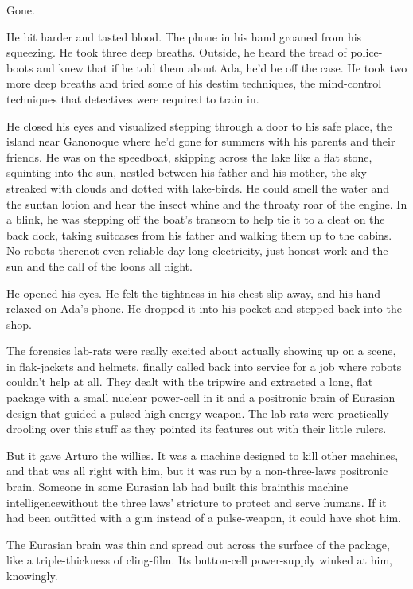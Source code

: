 Gone.

He bit harder and tasted blood. The phone in his hand groaned from
his squeezing. He took three deep breaths. Outside, he heard the
tread of police-boots and knew that if he told them about Ada, he’d
be off the case. He took two more deep breaths and tried some of
his destim techniques, the mind-control techniques that detectives
were required to train in.

He closed his eyes and visualized stepping through a door to his
safe place, the island near Ganonoque where he’d gone for summers
with his parents and their friends. He was on the speedboat,
skipping across the lake like a flat stone, squinting into the sun,
nestled between his father and his mother, the sky streaked with
clouds and dotted with lake-birds. He could smell the water and the
suntan lotion and hear the insect whine and the throaty roar of the
engine. In a blink, he was stepping off the boat’s transom to help
tie it to a cleat on the back dock, taking suitcases from his
father and walking them up to the cabins. No robots there{\dash}not even
reliable day-long electricity, just honest work and the sun and the
call of the loons all night.

He opened his eyes. He felt the tightness in his chest slip away,
and his hand relaxed on Ada’s phone. He dropped it into his pocket
and stepped back into the shop.

\tb

The forensics lab-rats were really excited about actually showing
up on a scene, in flak-jackets and helmets, finally called back
into service for a job where robots couldn’t help at all. They
dealt with the tripwire and extracted a long, flat package with a
small nuclear power-cell in it and a positronic brain of Eurasian
design that guided a pulsed high-energy weapon. The lab-rats were
practically drooling over this stuff as they pointed its features
out with their little rulers.

But it gave Arturo the willies. It was a machine designed to kill
other machines, and that was all right with him, but it was run by
a non-three-laws positronic brain. Someone in some Eurasian lab had
built this brain{\dash}this machine intelligence{\dash}without the three laws’
stricture to protect and serve humans. If it had been outfitted
with a gun instead of a pulse-weapon, it could have shot him.

The Eurasian brain was thin and spread out across the surface of
the package, like a triple-thickness of cling-film. Its button-cell
power-supply winked at him, knowingly.

